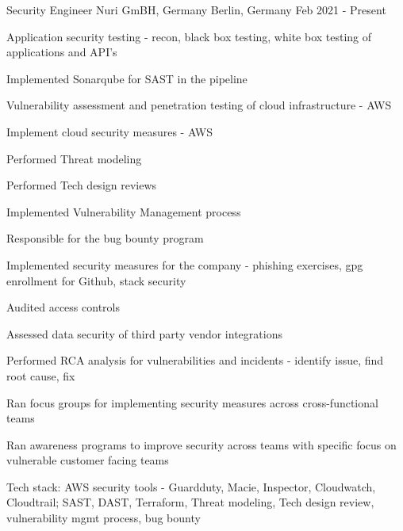 
\begin{cventries}

\cventry
    {Security Engineer} %
    {Nuri GmBH, Germany} %
    {Berlin, Germany} %
    {Feb 2021 - Present} %
    {
      \begin{cvitems} %
        \item {Application security testing - recon, black box testing, white box testing of applications and API's}
        \item {Implemented Sonarqube for SAST in the pipeline}
        \item {Vulnerability assessment and penetration testing of cloud infrastructure - AWS}
        \item {Implement cloud security measures - AWS}
        \item {Performed Threat modeling}
        \item {Performed Tech design reviews}
        \item {Implemented Vulnerability Management process}
        \item {Responsible for the bug bounty program}
        \item {Implemented security measures for the company - phishing exercises, gpg enrollment for Github, stack security}
        \item {Audited access controls}
        \item {Assessed data security of third party vendor integrations}
        \item {Performed RCA analysis for vulnerabilities and incidents - identify issue, find root cause, fix}
        \item {Ran focus groups for implementing security measures across cross-functional teams}
        \item {Ran awareness programs to improve security across teams with specific focus on vulnerable customer facing teams}
        \item {Tech stack: AWS security tools - Guardduty, Macie, Inspector, Cloudwatch, Cloudtrail; SAST, DAST, Terraform, Threat modeling, Tech design review, vulnerability mgmt process, bug bounty}
      \end{cvitems}
    }


\end{cventries}
